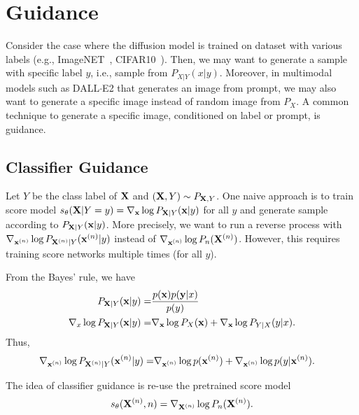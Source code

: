 \documentclass[11pt]{article}
\begin{document}
\section{Guidance}
Consider the case where the diffusion model is trained on dataset with various labels (e.g., ImageNET~\cite{deng2009imagenet}, CIFAR10~\cite{krizhevsky2009learning}).
Then, we may want to generate a sample with specific label $y$, i.e., sample from $P_{X|Y}(x|y)$.
Moreover, in multimodal models such as DALL$\cdot$E2 that generates an image from prompt,
we may also want to generate a specific image instead of random image from $P_X$.
A common technique to generate a specific image, conditioned on label or prompt, is guidance.

\subsection{Classifier Guidance}
Let $Y$ be the class label of ${\bf X}$ and $({\bf X}, Y)\sim P_{{\bf X},Y}$.
One naive approach is to train score model $s_{\theta}({\bf X}|Y=y) = \nabla_{{\bf x}} \log P_{{\bf X}|Y}({\bf x}|y)$ for all $y$
and generate sample according to $P_{{\bf X}|Y}({\bf x}|y)$.
More precisely, we want to run a reverse process with $\nabla_{{\bf x}^{(n)}} \log P_{{\bf X}^{(n)}|Y}({\bf x}^{(n)}|y)$  instead of $\nabla_{{\bf x}^{(n)}} \log P_n({\bf X}^{(n)})$.
However, this requires training score networks multiple times (for all $y$).

From the Bayes' rule, we have
\begin{align}
    P_{{\bf X}|Y}({\bf x}|y) =& \frac{p({\bf x})p({\bf y}|x)}{p(y)}\\
    \nabla_x \log P_{{\bf X}|Y}({\bf x}|y) =& \nabla_{{\bf x}} \log P_X({\bf x}) + \nabla_{{\bf x}}\log P_{Y|X}(y|x).
\end{align}
Thus, 
\begin{align}
    \nabla_{{\bf x}^{(n)}}\log P_{{\bf X}^{(n)}|Y}({\bf x}^{(n)}|y) =&     \nabla_{{\bf x}^{(n)}}\log {p({\bf x}^{(n)})}+    \nabla_{{\bf x}^{(n)}}\log{p(y|{\bf x}^{(n)})}.
\end{align}

The idea of classifier guidance is re-use the pretrained score model
\begin{align}
    s_{\theta}({\bf X}^{(n)}, n) = \nabla_{{\bf X}^{(n)}} \log P_{n} ({\bf X}^{(n)}).
\end{align}
\end{document}
